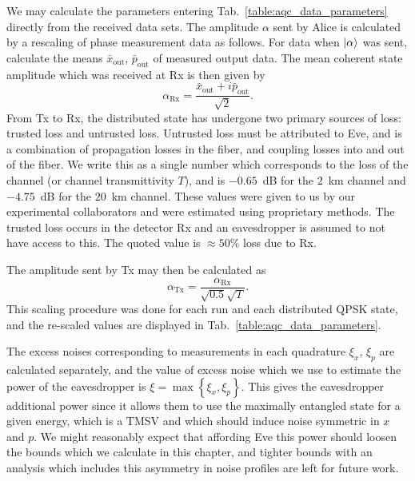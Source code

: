 We may calculate the parameters entering Tab.~\ref{table:aqc_data_parameters} directly from the received data sets. The amplitude $\alpha$ sent by Alice is calculated by a rescaling of phase measurement data as follows. For data when $\ket{\alpha}$ was sent, calculate the means $\bar{x}_{\text{out}}$, $\bar{p}_{\text{out}}$ of measured output data. The mean coherent state amplitude which was received at Rx is then given by 
\begin{equation}
\alpha_{\text{Rx}} = \frac{\bar{x}_{\text{out}} + i \bar{p}_{\text{out}}}{\sqrt{2}}.
\end{equation}
From Tx to Rx, the distributed state has undergone two primary sources of loss: trusted loss and untrusted loss. Untrusted loss must be attributed to Eve, and is a combination of propagation losses in the fiber, and coupling losses into and out of the fiber.  We write this as a single number which corresponds to the loss of the channel (or channel transmittivity $T$), and is $-0.65$~dB for the $2$~km channel and $-4.75$~dB for the $20$~km channel. These values were given to us by our experimental collaborators and were estimated using proprietary methods. The trusted loss occurs in the detector Rx and an eavesdropper is assumed to not have access to this. The quoted value is $\approx 50\%$ loss due to Rx.

The amplitude sent by Tx may then be calculated as
\begin{equation}
\alpha_{\text{Tx}} = \frac{\alpha_{\text{Rx}}}{\sqrt{0.5} \sqrt{T}}.
\end{equation}
This scaling procedure was done for each run and each distributed QPSK state, and the re-scaled values are displayed in Tab.~\ref{table:aqc_data_parameters}.

The excess noises corresponding to measurements in each quadrature $\xi_x$, $\xi_p$ are calculated separately, and the value of excess noise which we use to estimate the power of the eavesdropper is $\xi = \max \left\{\xi_x, \xi_p\right\}$. This gives the eavesdropper additional power since it allows them to use the maximally entangled state for a given energy, which is a TMSV and which should induce noise symmetric in $x$ and $p$. We might reasonably expect that affording Eve this power should loosen the bounds which we calculate in this chapter, and tighter bounds with an analysis which includes this asymmetry in noise profiles are left for future work.

